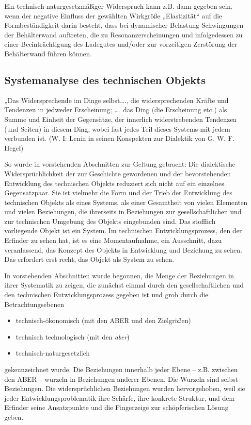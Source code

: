 \documentclass[12pt,a4paper]{article}
\begin{document}
Ein technisch-naturgesetzmäßiger Widerspruch kann z.B. dann gegeben sein, wenn
der negative Einfluss der gewählten Wirkgröße „Elastizität“ auf die
Formbeständigkeit darin besteht, dass bei dynamischer Belastung Schwingungen
der Behälterwand auftreten, die zu Resonanzerscheinungen und infolgedessen zu
einer Beeinträchtigung des Ladegutes und/oder zur vorzeitigen Zerstörung der
Behälterwand führen können.

\subsection{Systemanalyse des technischen Objekts}

„Das Widersprechende im Dinge selbst…., die widersprechenden Kräfte und
Tendenzen in jedweder Erscheinung; …. das Ding (die Erscheinung etc.) als
Summe und Einheit der Gegensätze, der innerlich widerstrebenden Tendenzen (und
Seiten) in diesem Ding, wobei fast jedes Teil dieses Systems mit jedem
verbunden ist. (W. I: Lenin in seinen Konspekten zur Dialektik von
G. W. F. Hegel)

So wurde in vorstehenden Abschnitten zur Geltung gebracht: Die dialektische
Widersprüchlichkeit der zur Geschichte gewordenen und der bevorstehenden
Entwicklung des technischen Objekts reduziert sich nicht auf ein einzelnes
Gegensatzpaar. Sie ist vielmehr die Form und der Trieb der Entwicklung des
technischen Objekts als eines Systems, als einer Gesamtheit von vielen
Elementen und vielen Beziehungen, die ihrerseits in Beziehungen zur
gesellschaftlichen und zur technischen Umgebung des Objekts eingebunden
sind. Das stofflich vorliegende Objekt ist ein System. Im technischen
Entwicklungsprozess, den der Erfinder zu sehen hat, ist es eine
Momentaufnahme, ein Ausschnitt, dazu veranlassend, das Konzept des Objekts in
Entwicklung und Beziehung zu sehen. Das erfordert erst recht, das Objekt als
System zu sehen.

In vorstehenden Abschnitten wurde begonnen, die Menge der Beziehungen in ihrer
Systematik zu zeigen, die zunächst einmal durch den gesellschaftlichen und den
technischen Entwicklungsprozess gegeben ist und grob durch die
Betrachtungsebenen
\begin{itemize}
\item technisch-ökonomisch (mit den ABER und den Zielgrößen)
\item technisch technologisch (mit den \emph{aber})
\item technisch-naturgesetzlich
\end{itemize}
gekennzeichnet wurde. Die Beziehungen innerhalb jeder Ebene – z.B. zwischen
den ABER – wurzeln in Beziehungen anderer Ebenen. Die Wurzeln sind selbst
Beziehungen. Die widersprüchlichen Beziehungen wurden hervorgehoben, weil sie
jeder Entwicklungsproblematik ihre Schärfe, ihre konkrete Struktur, und dem
Erfinder seine Ansatzpunkte und die Fingerzeige zur schöpferischen Lösung
geben.
\end{document}
